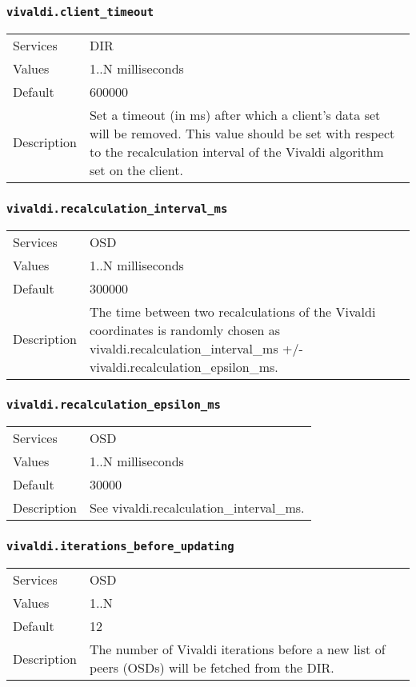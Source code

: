 \documentclass[a4paper,10pt]{book}
\begin{document}
\subsubsection{\texttt{vivaldi.client\_timeout}}
\begin{tabular}{lp{10cm}}
 Services & DIR\\
 Values   & 1..N milliseconds \\
 Default  & 600000 \\
 Description & Set a timeout (in ms) after which a client's data set will be removed. This value should be set with respect to the recalculation interval of the Vivaldi algorithm set on the client.
\end{tabular}

\subsubsection{\texttt{vivaldi.recalculation\_interval\_ms}}
\begin{tabular}{lp{10cm}}
 Services & OSD \\
 Values   & 1..N milliseconds \\
 Default  & 300000 \\
 Description & The time between two recalculations of the Vivaldi coordinates is randomly chosen as vivaldi.recalculation\_interval\_ms +/- vivaldi.recalculation\_epsilon\_ms.
\end{tabular}

\subsubsection{\texttt{vivaldi.recalculation\_epsilon\_ms}}
\begin{tabular}{lp{10cm}}
 Services & OSD \\
 Values   & 1..N milliseconds \\
 Default  & 30000 \\
 Description & See vivaldi.recalculation\_interval\_ms.
\end{tabular}

\subsubsection{\texttt{vivaldi.iterations\_before\_updating}}
\begin{tabular}{lp{10cm}}
 Services & OSD \\
 Values   & 1..N \\
 Default  & 12 \\
 Description & The number of Vivaldi iterations before a new list of peers (OSDs) will be fetched from the DIR.
\end{tabular}
\end{document}
